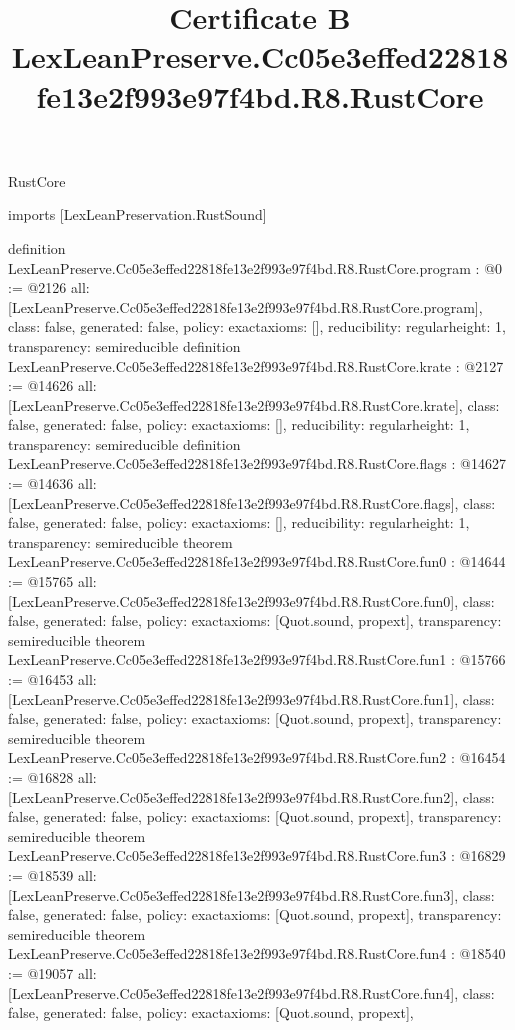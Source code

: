 \begin{lexlean}{RustCore}
\title{Certificate B LexLeanPreserve.Cc05e3effed22818fe13e2f993e97f4bd.R8.RustCore}
\begin{coremodule}
imports [LexLeanPreservation.RustSound]

definition LexLeanPreserve.Cc05e3effed22818fe13e2f993e97f4bd.R8.RustCore.program : @0 := @2126 {
  all: [LexLeanPreserve.Cc05e3effed22818fe13e2f993e97f4bd.R8.RustCore.program],
  class: false,
  generated: false,
  policy: exact{axioms: []},
  reducibility: regular{height: 1},
  transparency: semireducible
}
definition LexLeanPreserve.Cc05e3effed22818fe13e2f993e97f4bd.R8.RustCore.krate : @2127 := @14626 {
  all: [LexLeanPreserve.Cc05e3effed22818fe13e2f993e97f4bd.R8.RustCore.krate],
  class: false,
  generated: false,
  policy: exact{axioms: []},
  reducibility: regular{height: 1},
  transparency: semireducible
}
definition LexLeanPreserve.Cc05e3effed22818fe13e2f993e97f4bd.R8.RustCore.flags : @14627 := @14636 {
  all: [LexLeanPreserve.Cc05e3effed22818fe13e2f993e97f4bd.R8.RustCore.flags],
  class: false,
  generated: false,
  policy: exact{axioms: []},
  reducibility: regular{height: 1},
  transparency: semireducible
}
theorem LexLeanPreserve.Cc05e3effed22818fe13e2f993e97f4bd.R8.RustCore.fun0 : @14644 := @15765 {
  all: [LexLeanPreserve.Cc05e3effed22818fe13e2f993e97f4bd.R8.RustCore.fun0],
  class: false,
  generated: false,
  policy: exact{axioms: [Quot.sound, propext]},
  transparency: semireducible
}
theorem LexLeanPreserve.Cc05e3effed22818fe13e2f993e97f4bd.R8.RustCore.fun1 : @15766 := @16453 {
  all: [LexLeanPreserve.Cc05e3effed22818fe13e2f993e97f4bd.R8.RustCore.fun1],
  class: false,
  generated: false,
  policy: exact{axioms: [Quot.sound, propext]},
  transparency: semireducible
}
theorem LexLeanPreserve.Cc05e3effed22818fe13e2f993e97f4bd.R8.RustCore.fun2 : @16454 := @16828 {
  all: [LexLeanPreserve.Cc05e3effed22818fe13e2f993e97f4bd.R8.RustCore.fun2],
  class: false,
  generated: false,
  policy: exact{axioms: [Quot.sound, propext]},
  transparency: semireducible
}
theorem LexLeanPreserve.Cc05e3effed22818fe13e2f993e97f4bd.R8.RustCore.fun3 : @16829 := @18539 {
  all: [LexLeanPreserve.Cc05e3effed22818fe13e2f993e97f4bd.R8.RustCore.fun3],
  class: false,
  generated: false,
  policy: exact{axioms: [Quot.sound, propext]},
  transparency: semireducible
}
theorem LexLeanPreserve.Cc05e3effed22818fe13e2f993e97f4bd.R8.RustCore.fun4 : @18540 := @19057 {
  all: [LexLeanPreserve.Cc05e3effed22818fe13e2f993e97f4bd.R8.RustCore.fun4],
  class: false,
  generated: false,
  policy: exact{axioms: [Quot.sound, propext]},
}
\end{coremodule}
\end{lexlean}
